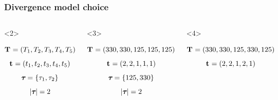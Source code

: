 \begin{frame}
    \frametitle{Divergence model choice}
    \begin{columns}[c]
            \begin{onlyenv}<2>
            \begin{displaybox}[4.5cm]
                {\small
                \[
                    \mathbf{T_{}} = (T_{1},T_{2},T_{3},T_{4},T_{5})
                \]\vspace{0mm}
                }
                \[
                    \mathbf{t_{}} = (t_{1},t_{2},t_{3},t_{4},t_{5})
                \]\vspace{0mm}
                \[
                    \boldsymbol{\tau_{}} = \{\tau_{1},\tau_{2}\}
                \]\vspace{0mm}
                \[
                    \lvert \boldsymbol{\tau_{}} \rvert = 2
                \]\vspace{0mm}
            \end{displaybox}
            \end{onlyenv}
            \begin{onlyenv}<3>
            \begin{displaybox}[4.5cm]
                {\small
                \[
                    \mathbf{T_{}} = (330,330,125,125,125)
                \]\vspace{0mm}
                }
                \[
                    \mathbf{t_{}} = (2,2,1,1,1)
                \]\vspace{0mm}
                \[
                    \boldsymbol{\tau_{}} = \{125,330\}
                \]\vspace{0mm}
                \[
                    \lvert \boldsymbol{\tau_{}} \rvert = 2
                \]\vspace{0mm}
            \end{displaybox}
            \end{onlyenv}
            \begin{onlyenv}<4>
            \begin{displaybox}[4.5cm]
                {\small
                \[
                    \mathbf{T_{}} = (330,330,125,330,125)
                \]\vspace{0mm}
                }
                \[
                    \mathbf{t_{}} = (2,2,1,2,1)
                \]\vspace{0mm}
                \[
\]
\end{displaybox}
\end{onlyenv}
\end{columns}
\end{frame}
